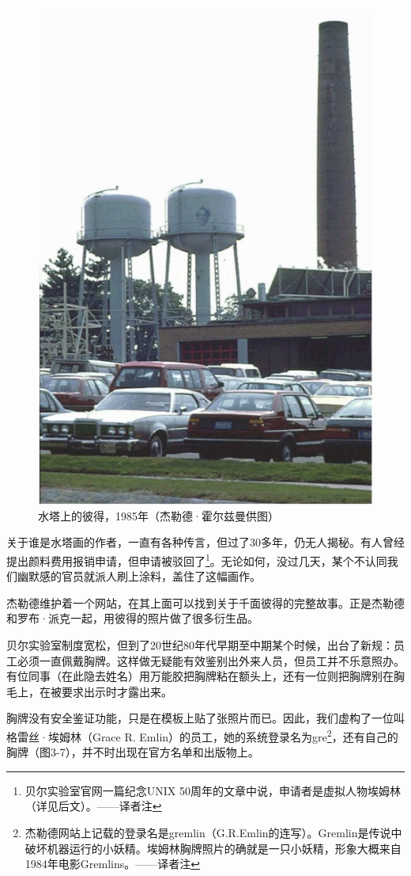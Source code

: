 \documentclass[a4paper,12pt,UTF8,twoside]{ctexbook}
\begin{document}
\begin{figure}[htbp]
	\centering
	\includegraphics[width=0.7\linewidth]{24}
	\caption{水塔上的彼得，1985年（杰勒德·霍尔兹曼供图）}
	\label{fig:1}
\end{figure}

关于谁是水塔画的作者，一直有各种传言，但过了30多年，仍无人揭秘。有人曾经提出颜料费用报销申请，但申请被驳回了\footnote{贝尔实验室官网一篇纪念UNIX 50周年的文章中说，申请者是虚拟人物埃姆林（详见后文）。——译者注}。无论如何，没过几天，某个不认同我们幽默感的官员就派人刷上涂料，盖住了这幅画作。

杰勒德维护着一个网站，在其上面可以找到关于千面彼得的完整故事。正是杰勒德和罗布·派克一起，用彼得的照片做了很多衍生品。

贝尔实验室制度宽松，但到了20世纪80年代早期至中期某个时候，出台了新规：员工必须一直佩戴胸牌。这样做无疑能有效鉴别出外来人员，但员工并不乐意照办。有位同事（在此隐去姓名）用万能胶把胸牌粘在额头上，还有一位则把胸牌别在胸毛上，在被要求出示时才露出来。

胸牌没有安全鉴证功能，只是在模板上贴了张照片而已。因此，我们虚构了一位叫格雷丝·埃姆林（Grace R. Emlin）的员工，她的系统登录名为gre\footnote{杰勒德网站上记载的登录名是gremlin（G.R.Emlin的连写）。Gremlin是传说中破坏机器运行的小妖精。埃姆林胸牌照片的确就是一只小妖精，形象大概来自1984年电影Gremlins。——译者注}，还有自己的胸牌（图3-7），并不时出现在官方名单和出版物上。
\end{document}

